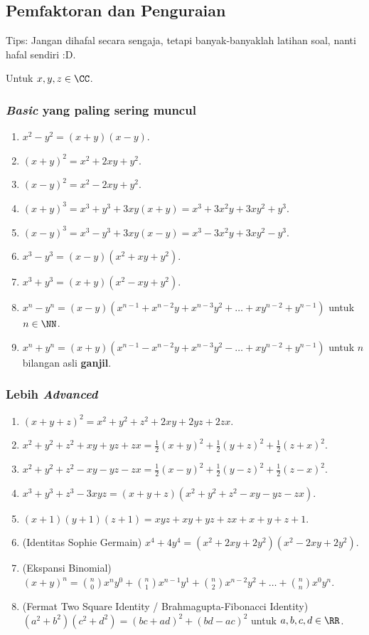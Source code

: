 \subsection{Pemfaktoran dan Penguraian}
Tips: Jangan dihafal secara sengaja, tetapi banyak-banyaklah latihan soal, nanti hafal sendiri :D.
	
	Untuk $x,y,z \in \CC$.

        \subsubsection{\textit{Basic} yang paling sering muncul}
        \begin{enumerate}
            \item $x^2-y^2 = (x+y)(x-y)$.
	    \item $(x+y)^2 = x^2+2xy+y^2$.
	    \item $(x-y)^2 = x^2-2xy+y^2$.
            \item $(x+y)^3 = x^3+y^3+3xy(x+y) = x^3+3x^2y+3xy^2+y^3$. 
	    \item $(x-y)^3 = x^3-y^3+3xy(x-y) = x^3-3x^2y+3xy^2-y^3$. 
	    \item $x^3-y^3 = (x-y)(x^2+xy+y^2)$.
	    \item $x^3+y^3 = (x+y)(x^2-xy+y^2)$.
	    \item $x^n-y^n = (x-y)(x^{n-1}+x^{n-2}y+x^{n-3}y^2+\dots+xy^{n-2}+y^{n-1})$ untuk $n \in \NN$.
	    \item $x^n+y^n = (x+y)(x^{n-1}-x^{n-2}y+x^{n-3}y^2-\dots+xy^{n-2}+y^{n-1})$ untuk $n$ bilangan asli \textbf{ganjil}.
        \end{enumerate}

        \subsubsection{Lebih \textit{Advanced}}
	\begin{enumerate}
	    \item $(x+y+z)^2 = x^2+y^2+z^2+2xy+2yz+2zx$.
	    \item $x^2+y^2+z^2+xy+yz+zx = \frac12(x+y)^2+\frac12(y+z)^2+\frac12(z+x)^2$.
	    \item $x^2+y^2+z^2-xy-yz-zx = \frac12(x-y)^2+\frac12(y-z)^2+\frac12(z-x)^2$.
	    \item $x^3+y^3+z^3-3xyz = (x+y+z)(x^2+y^2+z^2-xy-yz-zx)$.
	    \item $(x+1)(y+1)(z+1)=xyz+xy+yz+zx+x+y+z+1$.
	    \item (Identitas Sophie Germain) $x^4+4y^4=(x^2+2xy+2y^2)(x^2-2xy+2y^2)$.
	    \item (Ekspansi Binomial) $(x+y)^n = {n \choose 0}x^ny^0 + {n \choose 1}x^{n-1}y^1+{n \choose 2}x^{n-2}y^2 + \dots + {n \choose n}x^0y^n$.
	    \item (Fermat Two Square Identity / Brahmagupta-Fibonacci Identity)\\
        $(a^2+b^2)(c^2+d^2)=(bc+ad)^2+(bd-ac)^2$ untuk $a,b,c,d \in \RR$.
	\end{enumerate}

 